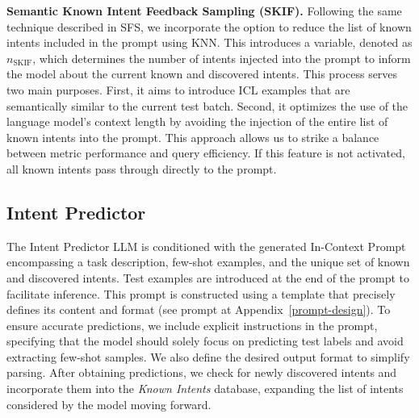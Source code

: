 \documentclass[11pt]{article}
\begin{document}
\vspace{3px}
\textbf{Semantic Known Intent Feedback Sampling (SKIF).} Following the same technique described in SFS, we incorporate the option to reduce the list of known intents included in the prompt using KNN. This introduces a variable, denoted as $n_{\text{SKIF}}$, which determines the number of intents injected into the prompt to inform the model about the current known and discovered intents. This process serves two main purposes. First, it aims to introduce ICL examples that are semantically similar to the current test batch. Second, it optimizes the use of the language model's context length by avoiding the injection of the entire list of known intents into the prompt. This approach allows us to strike a balance between metric performance and query efficiency. If this feature is not activated, all known intents pass through directly to the prompt.

\subsection{Intent Predictor}
The Intent Predictor LLM is conditioned with the generated In-Context Prompt encompassing a task description, few-shot examples, and the unique set of known and discovered intents. Test examples are introduced at the end of the prompt to facilitate inference. This prompt is constructed using a template that precisely defines its content and format (see prompt at Appendix~\ref{prompt-design}). To ensure accurate predictions, we include explicit instructions in the prompt, specifying that the model should solely focus on predicting test labels and avoid extracting few-shot samples. We also define the desired output format to simplify parsing. After obtaining predictions, we check for newly discovered intents and incorporate them into the \textit{Known Intents} database, expanding the list of intents considered by the model moving forward.
\end{document}
